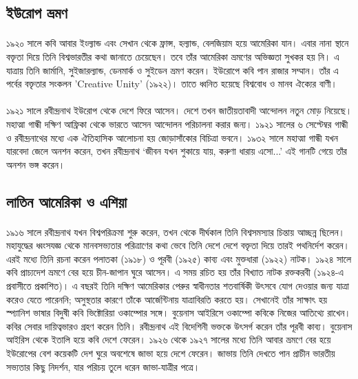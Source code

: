 \documentclass{article}
\begin{document}
\subsection{ইউরোপ ভ্রমণ}
\paragraph{}
১৯২০ সালে কবি আবার ইংল্যান্ড এবং সেখান থেকে ফ্রান্স, হল্যান্ড, বেলজিয়াম হয়ে আমেরিকা যান। এবার নানা স্থানে বক্তৃতা দিয়ে তিনি বিশ্বভারতীর কথা জানাতে চেয়েছেন। তবে তাঁর আমেরিকা ভ্রমণের অভিজ্ঞতা সুখকর হয় নি। এ যাত্রায় তিনি জার্মানি, সুইজারল্যান্ড, ডেনমার্ক ও সুইডেন ভ্রমণ করেন। ইউরোপে কবি পান রাজার সম্মান। তাঁর এ পর্বের বক্তৃতার সংকলন 'Creative Unity' (১৯২২)। তাতে ধ্বনিত হয়েছে বিশ্ববোধ ও মানব ঐক্যের বাণী।
\paragraph{}
১৯২১ সালে রবীন্দ্রনাথ ইউরোপ থেকে দেশে ফিরে আসেন। দেশে তখন জাতীয়তাবাদী আন্দোলন নতুন মোড় নিয়েছে। মহাত্মা গান্ধী দক্ষিণ আফ্রিকা থেকে ভারতে আসেন আন্দোলন পরিচালনা করার জন্য। ১৯২১ সালের ৬ সেপ্টেম্বর গান্ধী ও রবীন্দ্রনাথের মধ্যে এক ঐতিহাসিক আলোচনা হয় জোড়াসাঁকোর বিচিত্রা ভবনে। ১৯৩২ সালে মহাত্মা গান্ধী যখন যারবেদা জেলে অনশন করেন, তখন রবীন্দ্রনাথ ‘জীবন যখন শুকায়ে যায়, করুণা ধারায় এসো...’ এই গানটি গেয়ে তাঁর  অনশন ভঙ্গ করেন।
\subsection{লাতিন আমেরিকা ও এশিয়া}
\paragraph{}
১৯১৬ সালে রবীন্দ্রনাথ যখন বিশ্বপরিক্রমা শুরু করেন, তখন থেকে দীর্ঘকাল তিনি বিশ্বসমস্যার চিন্তায় আচ্ছন্ন ছিলেন। মহাযুদ্ধের ধ্বংসযজ্ঞ থেকে মানবসভ্যতার পরিত্রাণের কথা ভেবে তিনি দেশে দেশে বক্তৃতা দিয়ে তারই পথনির্দেশ করেন। এরই মধ্যে তিনি রচনা করেন পলাতকা (১৯১৮) ও পূরবী (১৯২৫) কাব্য এবং মুক্তধারা (১৯২২) নাটক। ১৯২৪ সালে কবি প্রাচ্যদেশ ভ্রমণে বের হয়ে চীন-জাপান ঘুরে আসেন। এ সময় রচিত হয় তাঁর বিখ্যাত নাটক রক্তকরবী (১৯২৪-এ প্রবাসীতে প্রকাশিত)। এ বছরই তিনি দক্ষিণ আমেরিকার পেরুর স্বাধীনতার শতবার্ষিকী উৎসবে যোগ দেওয়ার জন্য যাত্রা করেও যেতে পারেননি; অসুস্থতার কারণে তাঁকে আর্জেন্টিনায় যাত্রাবিরতি করতে হয়। সেখানেই তাঁর সাক্ষাৎ হয় স্প্যানিশ ভাষার বিদুষী কবি ভিক্টোরিয়া ওকাম্পোর সঙ্গে। বুয়েনাস আইরিসে ওকাম্পো কবিকে নিজের আতিথ্যে রাখেন। কবির সেবার দায়িত্বভারও গ্রহণ করেন তিনি। রবীন্দ্রনাথ এই বিদেশিনী ভক্তকে উৎসর্গ করেন তাঁর পূরবী কাব্য। বুয়েনাস আইরিস থেকে ইতালি হয়ে কবি দেশে ফেরেন। ১৯২৬ থেকে ১৯২৭ সালের মধ্যে তিনি আবার ভ্রমণে বের হয়ে ইউরোপের বেশ কয়েকটি দেশ ঘুরে অবশেষে জাভা হয়ে দেশে ফেরেন। জাভায় তিনি দেখতে পান প্রাচীন ভারতীয় সভ্যতার কিছু নিদর্শন, যার পরিচয় তুলে ধরেন জাভা-যাত্রীর পত্রে।
\end{document}
